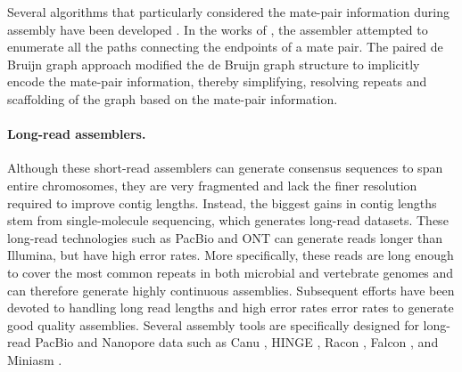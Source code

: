 Several algorithms that particularly considered the mate-pair information during assembly have been developed .
 In the works of \cite{butler2008allpaths, bankevich2012spades}, the assembler attempted to enumerate all the paths connecting the endpoints of a mate pair.
The paired de Bruijn graph \citep{medvedev2011paired} approach modified the de Bruijn graph
structure to implicitly encode the mate-pair information, thereby simplifying, resolving repeats and scaffolding of the graph based on the mate-pair information.
\paragraph{Long-read assemblers.}
Although these short-read assemblers can generate consensus sequences to span entire chromosomes, they are very fragmented and lack the finer resolution required to improve contig lengths. 
Instead, the biggest gains in contig lengths stem from single-molecule sequencing, which generates long-read datasets.
These long-read technologies such as PacBio and ONT can generate reads longer than Illumina, but have high error rates. 
More specifically, these reads are long enough to cover the most common repeats in both microbial and vertebrate genomes and can therefore generate highly continuous assemblies. 
Subsequent efforts have been devoted to handling long read lengths and high error rates error rates to generate good quality assemblies.
Several assembly tools are specifically designed for long-read PacBio and Nanopore data such as Canu \citep{koren2017canu}, HINGE \citep{kamath2017hinge}, Racon \citep{vaser2017fast}, Falcon \citep{chin2016phased}, and Miniasm \citep{li2016minimap}.

